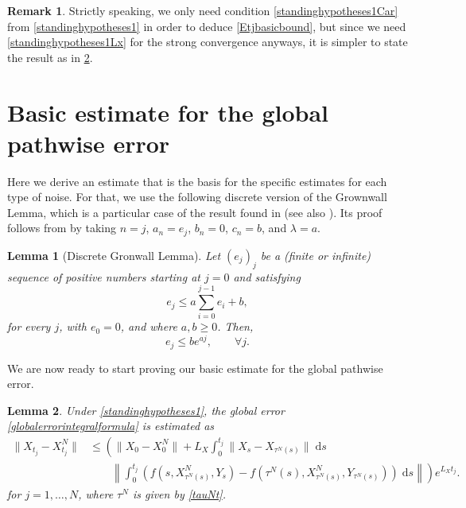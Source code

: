 \documentclass[reqno,12pt]{amsart}
\theoremstyle{plain} %
\newtheorem{lemma}{Lemma}[section]
\theoremstyle{definition} %
\newtheorem{remark}{Remark}[section]
\begin{document}
\begin{remark}
    Strictly speaking, we only need condition \eqref{standinghypotheses1Car} from \cref{standinghypotheses1} in order to deduce \eqref{Etjbasicbound}, but since we need \eqref{standinghypotheses1Lx} for the strong convergence anyways, it is simpler to state the result as in \cref{lembasicestimate}.
\end{remark}

\section{Basic estimate for the global pathwise error}

Here we derive an estimate that is the basis for the specific estimates for each type of noise. For that, we use the following discrete version of the Grownwall Lemma, which is a particular case of the result found in \cite{GiraultRaviart1981} (see also \cite{Clark1987}). Its proof follows from \cite[Lemma V.2.4]{GiraultRaviart1981} by taking $n = j$, $a_n = e_j$, $b_n = 0$, $c_n = b$, and $\lambda = a$.

\begin{lemma}[Discrete Gronwall Lemma]
    \label{lemdiscretegronwall}
    Let $(e_j)_j$ be a (finite or infinite) sequence of positive numbers starting at $j=0$ and satisfying
    \begin{equation}
        \label{integralgronwall}
        e_j \leq a \sum_{i=0}^{j-1} e_i + b,
    \end{equation}
    for every $j$, with $e_0 = 0$, and where $a, b \geq 0$. Then,
    \begin{equation}
        \label{estimateintegralgronwall}
        e_j \leq b e^{aj}, \qquad \forall j.
    \end{equation}
\end{lemma}

We are now ready to start proving our basic estimate for the global pathwise error.
\begin{lemma}
    \label{lembasicestimate}
    Under \cref{standinghypotheses1}, the global error \eqref{globalerrorintegralformula} is estimated as
    \begin{equation}
        \label{Etjbasicbound}
        \begin{aligned}
            \|X_{t_j} - X_{t_j}^N\| & \leq \left( \|X_0 - X_0^N\| + L_X \int_0^{t_j} \|X_s - X_{\tau^N(s)}\| \;\mathrm{d}s \right. \\
            & \qquad \left. \left\|\int_0^{t_j} \left( f(s, X_{\tau^N(s)}^N, Y_s) - f(\tau^N(s), X_{\tau^N(s)}^N, Y_{\tau^N(s)}) \right)\;\mathrm{d}s\right\|\right) e^{L_X t_j}.
        \end{aligned}
    \end{equation}
    for $j=1, \ldots, N$, where $\tau^N$ is given by \eqref{tauNt}.
\end{lemma}
\end{document}
